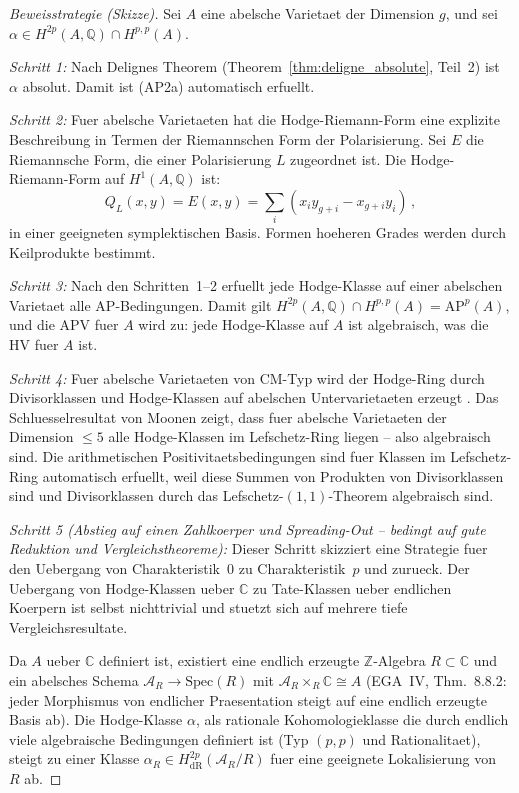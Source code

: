 \documentclass[aps,prd,twocolumn,superscriptaddress,nofootinbib]{revtex4-2}
\theoremstyle{definition}
\theoremstyle{remark}
\begin{document}
\begin{proof}[Beweisstrategie (Skizze)]
Sei $A$ eine abelsche Varietaet der Dimension $g$, und sei $\alpha \in H^{2p}(A, \mathbb{Q}) \cap H^{p,p}(A)$.

\textit{Schritt 1:} Nach Delignes Theorem (Theorem~\ref{thm:deligne_absolute}, Teil~2) ist $\alpha$ absolut. Damit ist (AP2a) automatisch erfuellt.

\textit{Schritt 2:} Fuer abelsche Varietaeten hat die Hodge-Riemann-Form eine explizite Beschreibung in Termen der Riemannschen Form der Polarisierung. Sei $E$ die Riemannsche Form, die einer Polarisierung $L$ zugeordnet ist. Die Hodge-Riemann-Form auf $H^1(A, \mathbb{Q})$ ist:
\begin{equation}
Q_L(x, y) = E(x, y) = \sum_{i} (x_i y_{g+i} - x_{g+i} y_i)\,,
\end{equation}
in einer geeigneten symplektischen Basis. Formen hoeheren Grades werden durch Keilprodukte bestimmt.

\textit{Schritt 3:} Nach den Schritten~1--2 erfuellt jede Hodge-Klasse auf einer abelschen Varietaet alle AP-Bedingungen. Damit gilt $H^{2p}(A, \mathbb{Q}) \cap H^{p,p}(A) = \mathrm{AP}^p(A)$, und die APV fuer $A$ wird zu: jede Hodge-Klasse auf $A$ ist algebraisch, was die HV fuer $A$ ist.

\textit{Schritt 4:} Fuer abelsche Varietaeten von CM-Typ wird der Hodge-Ring durch Divisorklassen und Hodge-Klassen auf abelschen Untervarietaeten erzeugt \cite{Abdulali1994}. Das Schluesselresultat von Moonen \cite{Moonen1999} zeigt, dass fuer abelsche Varietaeten der Dimension $\leq 5$ alle Hodge-Klassen im Lefschetz-Ring liegen -- also algebraisch sind. Die arithmetischen Positivitaetsbedingungen sind fuer Klassen im Lefschetz-Ring automatisch erfuellt, weil diese Summen von Produkten von Divisorklassen sind und Divisorklassen durch das Lefschetz-$(1,1)$-Theorem algebraisch sind.

\textit{Schritt 5 (Abstieg auf einen Zahlkoerper und Spreading-Out -- bedingt auf gute Reduktion und Vergleichstheoreme):} Dieser Schritt skizziert eine Strategie fuer den Uebergang von Charakteristik~$0$ zu Charakteristik~$p$ und zurueck. Der Uebergang von Hodge-Klassen ueber $\mathbb{C}$ zu Tate-Klassen ueber endlichen Koerpern ist selbst nichttrivial und stuetzt sich auf mehrere tiefe Vergleichsresultate.

Da $A$ ueber $\mathbb{C}$ definiert ist, existiert eine endlich erzeugte $\mathbb{Z}$-Algebra $R \subset \mathbb{C}$ und ein abelsches Schema $\mathcal{A}_R \to \mathrm{Spec}(R)$ mit $\mathcal{A}_R \times_R \mathbb{C} \cong A$ (EGA~IV, Thm.\ 8.8.2: jeder Morphismus von endlicher Praesentation steigt auf eine endlich erzeugte Basis ab). Die Hodge-Klasse $\alpha$, als rationale Kohomologieklasse die durch endlich viele algebraische Bedingungen definiert ist (Typ $(p,p)$ und Rationalitaet), steigt zu einer Klasse $\alpha_R \in H^{2p}_{\mathrm{dR}}(\mathcal{A}_R/R)$ fuer eine geeignete Lokalisierung von~$R$ ab.


\end{proof}
\end{document}
